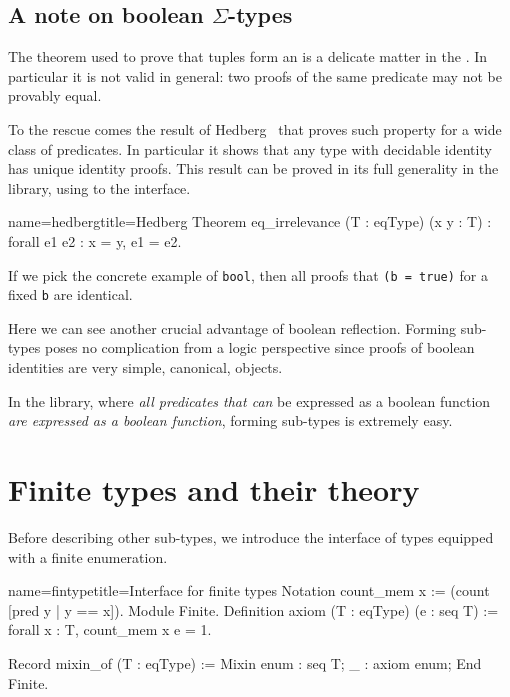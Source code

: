 \subsection{A note on boolean $\Sigma$-types\label{hedberg}}

The  theorem used to prove that tuples form an
 is a delicate matter in the \mcbCIC{}.  In particular it
is not valid in general: two proofs of the same predicate may not be
provably equal.

To the rescue comes the result of Hedberg~\cite{Hedberg}
that proves such property for a wide class of predicates.
In particular it shows that any type with decidable identity
has unique identity proofs. This result can be proved in its full generality
in the \mcbMC{} library, using to the  interface.

\begin{coq}{name=hedberg}{title=Hedberg}
Theorem eq_irrelevance (T : eqType) (x y : T) : forall e1 e2 : x = y, e1 = e2.
\end{coq}

If we pick the concrete example of \lstinline/bool/,
then all proofs that \lstinline/(b = true)/
for a fixed \lstinline/b/ are identical.

Here we can see another crucial advantage of boolean reflection.
Forming sub-types poses no complication from a logic perspective since
proofs of boolean identities are very simple, canonical, objects.

In the \mcbMC{} library, where \emph{all predicates that can} be
expressed as a boolean function \emph{are expressed as a boolean
function}, forming sub-types is extremely easy.


\section{Finite types and their theory}

Before describing other sub-types, we introduce the interface of
types equipped with a finite enumeration.

\begin{coq}{name=fintype}{title=Interface for finite types}
Notation count_mem x := (count [pred y | y == x]).
Module Finite.
Definition axiom (T : eqType) (e : seq T) :=
  forall x : T, count_mem x e = 1.

Record mixin_of (T : eqType) := Mixin {
  enum : seq T;
  _ : axiom enum;
}
End Finite.
\end{coq}

